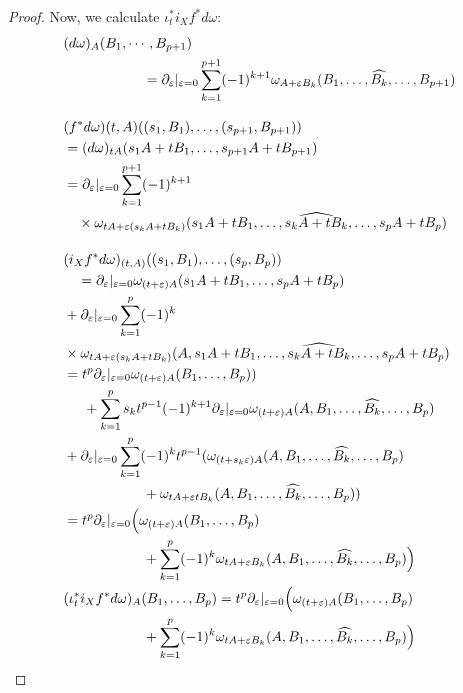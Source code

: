 \documentclass[b5paper,draft,openbib,12pt]{memoir}
\begin{document}
\begin{proof}
  
  Now, we calculate \(\iota^*_t i_X f^* d \omega\):
  \begin{align}\notag
  &(d\omega)_A(B_1,\cdots, B_{p+1})\\
  &\hspace{2cm}=\partial_\varepsilon |_{\varepsilon=0} \sum_{k=1}^{p+1} (-1)^{k+1} \omega_{A+\varepsilon B_k}(B_1,\dots , \widehat{B_k}, \dots, B_{p+1})\\[0.3cm]
  &(f^* d \omega){(t,A)}((s_1,B_1),\dots , (s_{p+1},B_{p+1}))\\\notag
  &= (d\omega)_{tA}(s_1A + t B_1, \dots, s_{p+1}A+t B_{p+1})\\
  &=\partial_{\varepsilon}|_{\varepsilon =0} \sum_{k=1}^{p+1}(-1)^{k+1}\\\notag
  &\quad \times\omega_{tA + \varepsilon(s_kA + t B_k)}(s_1A+tB_1, \dots,  \widehat{s_k A + t B_k},\dots , s_p A  + t B_p )\\[0.4cm]
  &(i_X f^* d \omega)_{(t,A)}((s_1,B_1),\dots , (s_p, B_p))\\\notag
  &\quad= \partial_{\varepsilon} |_{\varepsilon =0} \omega_{(t+\varepsilon)A}(s_1A+tB_1, \dots, s_pA+t B_p)\\\notag
  &+\partial_{\varepsilon}|_{\varepsilon=0} \sum_{k=1}^p (-1)^k\\\notag
  &\times\omega_{tA + \varepsilon(s_k A + t B_k)} (A,s_1A+t B_1, \dots, \widehat{s_k A + t B_k},\dots, s_p A + t B_p)\\
  &= t^p \partial_{\varepsilon}|_{\varepsilon=0}\omega_{(t+\varepsilon)A }(B_1,\dots,  B_p))\\
  &\hspace{0.5cm}+ \sum_{k=1}^p s_k t^{p-1} (-1)^{k+1} \partial_{\varepsilon}|_{\varepsilon=0}\omega_{(t+\varepsilon)A}(A,B_1,\dots,\widehat{B_k},\dots, B_p) \\
  &+\partial_{\varepsilon}|_{\varepsilon=0}\sum_{k=1}^p(-1)^k t^{p-1}(\omega_{(t+s_k\varepsilon)A}(A,B_1,\dots, \widehat{B_k},\dots, B_p) \\
  &\hspace{2cm} + \omega_{tA + \varepsilon t B_k}(A,B_1, \dots, \widehat{B_k},\dots, B_p))\\
  &=t^p\partial_{\varepsilon}|_{\varepsilon=0} \Big(\omega_{(t+\varepsilon)A}(B_1,\dots, B_p)\\\notag
  &\hspace{2cm} +\sum_{k=1}^p (-1)^k \omega_{tA+\varepsilon B_k}(A,B_1,\dots, \widehat{B_k},\dots, B_p)\Big)\\\label{li derivative 2}
  &(\iota_t^* i_X f^* d \omega)_{A}(B_1,\dots ,  B_p)=t^p\partial_{\varepsilon}|_{\varepsilon=0} \Big(\omega_{(t+\varepsilon)A}(B_1,\dots, B_p)\\\notag
  &\hspace{2cm}+\sum_{k=1}^p (-1)^k \omega_{tA+\varepsilon B_k}(A,B_1,\dots, \widehat{B_k},\dots, B_p)\Big)
  \end{align}
  

\end{proof}
\end{document}
